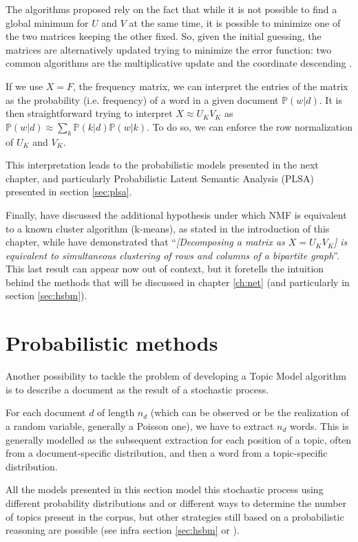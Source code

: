 \documentclass[11pt, a4paper, oneside, openright]{book}
\begin{document}
The algorithms proposed rely on the fact that while it is not possible to find a global minimum for $U$ and $V$ at the same time, it is possible to minimize one of the two matrices keeping the other fixed.
So, given the initial guessing, the matrices are alternatively updated trying to minimize the error function: two common algorithms are the multiplicative update \parencite{lee2000} and the coordinate descending \parencite{hsieh2011}.

If we use $X=F$, the frequency matrix, we can interpret the entries of the matrix as the probability (i.e. frequency) of a word in a given document $\mathbb{P}(w|d)$. It is then straightforward trying to interpret $X \approx U_K V_K$ as $\mathbb{P}(w|d) \approx \sum_k \mathbb{P}(k|d) \mathbb{P}(w|k)$. To do so, we can enforce the row normalization of $U_K$ and $V_K$.

This interpretation leads to the probabilistic models presented in the next chapter, and particularly Probabilistic Latent Semantic Analysis (PLSA) presented in section \ref{sec:plsa}.

Finally, \textcite{kim2008} have discussed the additional hypothesis under which NMF is equivalent to a known cluster algorithm (k-means), as stated in the introduction of this chapter, while \textcite{ding2005} have demonstrated that ``\textit{[Decomposing a matrix as $X = U_K V_K$] is equivalent to simultaneous clustering of rows and columns of a bipartite graph}''. This last result can appear now out of context, but it foretells the intuition behind the methods that will be discussed in chapter \ref{ch:net} (and particularly in section \ref{sec:hsbm}). 


\chapter{Probabilistic methods}
Another possibility to tackle the problem of developing a Topic Model algorithm is to describe a document as the result of a stochastic process.

For each document $d$ of length $n_d$ (which can be observed or be the realization of a random variable, generally a Poisson one), we have to extract $n_d$ words. This is generally modelled as the subsequent extraction for each position of a topic, often from a document-specific distribution, and then a word from a topic-specific distribution.

All the models presented in this section model this stochastic process using different probability distributions and or different ways to determine the number of topics present in the corpus, but other strategies still based on a probabilistic reasoning are possible (see infra section \ref{sec:hsbm} or \cite{arora2012}).
\end{document}
